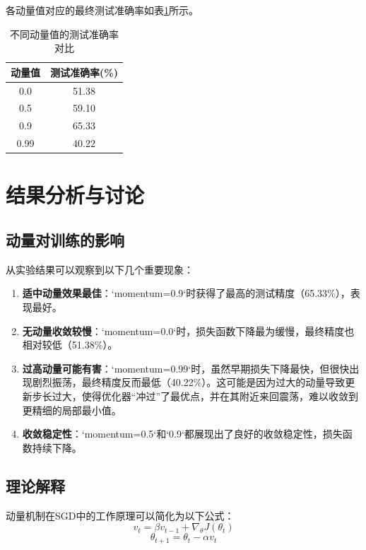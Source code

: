 \documentclass[12pt,a4paper,UTF8]{ctexart}
\begin{document}
各动量值对应的最终测试准确率如表\ref{tab:momentum_accuracy}所示。

\begin{table}[H]
\centering
\caption{不同动量值的测试准确率对比}
\begin{tabular}{@{}cc@{}}
\toprule
动量值 & 测试准确率(\%) \\
\midrule
0.0 & 51.38 \\
0.5 & 59.10 \\
0.9 & 65.33 \\
0.99 & 40.22 \\
\bottomrule
\end{tabular}
\label{tab:momentum_accuracy}
\end{table}

\section{结果分析与讨论}
\subsection{动量对训练的影响}
从实验结果可以观察到以下几个重要现象：

\begin{enumerate}
    \item \textbf{适中动量效果最佳}：`momentum=0.9`时获得了最高的测试精度（65.33\%），表现最好。
    \item \textbf{无动量收敛较慢}：`momentum=0.0`时，损失函数下降最为缓慢，最终精度也相对较低（51.38\%）。
    \item \textbf{过高动量可能有害}：`momentum=0.99`时，虽然早期损失下降最快，但很快出现剧烈振荡，最终精度反而最低（40.22\%）。这可能是因为过大的动量导致更新步长过大，使得优化器“冲过”了最优点，并在其附近来回震荡，难以收敛到更精细的局部最小值。
    \item \textbf{收敛稳定性}：`momentum=0.5`和`0.9`都展现出了良好的收敛稳定性，损失函数持续下降。
\end{enumerate}

\subsection{理论解释}
动量机制在SGD中的工作原理可以简化为以下公式：
\begin{equation}
v_t = \beta v_{t-1} + \nabla_\theta J(\theta_t)
\end{equation}
\begin{equation}
\theta_{t+1} = \theta_t - \alpha v_t
\end{equation}
\end{document}
